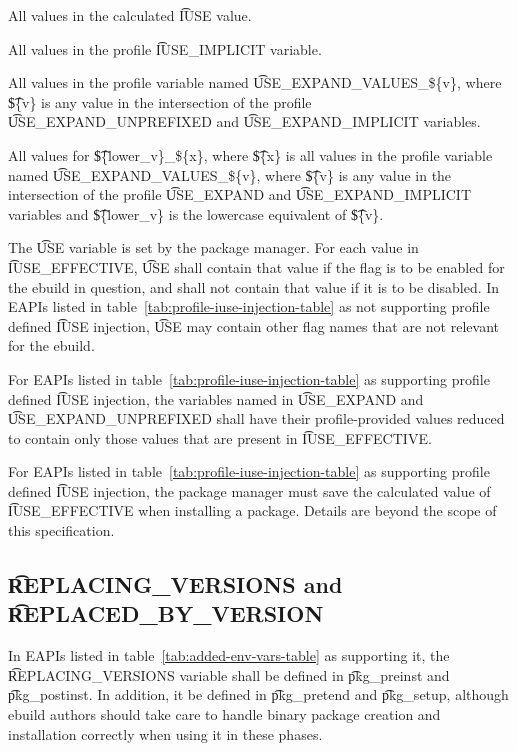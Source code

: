 \begin{compactitem}
\item All values in the calculated \t{IUSE} value.
\item All values in the profile \t{IUSE\_IMPLICIT} variable.
\item All values in the profile variable named \t{USE\_EXPAND\_VALUES\_\$\{v\}}, where \t{\$\{v\}}
    is any value in the intersection of the profile \t{USE\_EXPAND\_UNPREFIXED} and
    \t{USE\_EXPAND\_IMPLICIT} variables.
\item All values for \t{\$\{lower\_v\}\_\$\{x\}}, where \t{\$\{x\}} is all values in the profile
    variable named \t{USE\_EXPAND\_VALUES\_\$\{v\}}, where \t{\$\{v\}} is any value in the
    intersection of the profile \t{USE\_EXPAND} and \t{USE\_EXPAND\_IMPLICIT} variables and
    \t{\$\{lower\_v\}} is the lowercase equivalent of \t{\$\{v\}}.
\end{compactitem}

The \t{USE} variable is set by the package manager. For each value in \t{IUSE\_EFFECTIVE}, \t{USE}
shall contain that value if the flag is to be enabled for the ebuild in question, and shall not
contain that value if it is to be disabled. In EAPIs listed in
table~\ref{tab:profile-iuse-injection-table} as not supporting profile defined \t{IUSE} injection,
\t{USE} may contain other flag names that are not relevant for the ebuild.

For EAPIs listed in table~\ref{tab:profile-iuse-injection-table} as supporting profile defined
\t{IUSE} injection, the variables named in \t{USE\_EXPAND} and \t{USE\_EXPAND\_UNPREFIXED} shall
have their profile-provided values reduced to contain only those values that are present in
\t{IUSE\_EFFECTIVE}.

For EAPIs listed in table~\ref{tab:profile-iuse-injection-table} as supporting profile defined
\t{IUSE} injection, the package manager must save the calculated value of \t{IUSE\_EFFECTIVE} when
installing a package. Details are beyond the scope of this specification.

\subsection{\t{REPLACING\_VERSIONS} and \t{REPLACED\_BY\_VERSION}}
\label{sec:replacing-versions}

 In EAPIs listed in table~\ref{tab:added-env-vars-table} as
supporting it, the \t{REPLACING\_VERSIONS} variable shall be defined in \t{pkg\_preinst} and
\t{pkg\_postinst}.  In addition, it  be defined in \t{pkg\_pretend} and \t{pkg\_setup},
although ebuild authors should take care to handle binary package creation and installation
correctly when using it in these phases.

